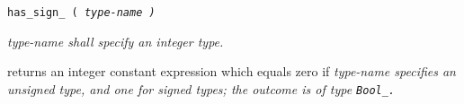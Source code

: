 
\tt{has_sign_ (} \it{type-name} \tt{)}


\it{type-name} shall specify an integer type.


 returns an integer constant expression which equals zero
if \it{type-name} specifies an unsigned type, and one for signed types;
the outcome is of type \tt{Bool_}.
